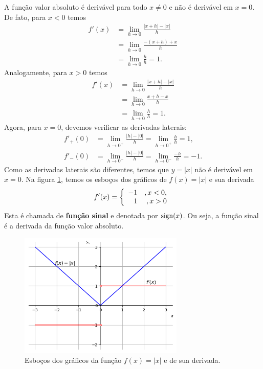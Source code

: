 \begin{ex}\label{ex:deriv_dabs}
  A função valor absoluto é derivável para todo $x\neq 0$ e não é derivável em $x=0$. De fato, para $x<0$ temos
  \begin{align}
    f'(x) &= \lim_{h\to 0} \frac{|x+h|-|x|}{h}\\
          &= \lim_{h\to 0} \frac{-(x+h)+x}{h}\\
          &= \lim_{h\to 0} \frac{h}{h} = 1.
  \end{align}
  Analogamente, para $x>0$ temos
  \begin{align}
    f'(x) &= \lim_{h\to 0} \frac{|x+h|-|x|}{h}\\
          &= \lim_{h\to 0} \frac{x+h-x}{h}\\
          &= \lim_{h\to 0} \frac{h}{h} = 1.
  \end{align}
  Agora, para $x=0$, devemos verificar as derivadas laterais:
  \begin{align}
    f'_+(0) &= \lim_{h\to 0^+} \frac{|h|-|0|}{h} = \lim_{h\to 0^+} \frac{h}{h} = 1,\\
    f'_-(0) &= \lim_{h\to 0^-} \frac{|h|-|0|}{h} = \lim_{h\to 0^-} \frac{-h}{h} = -1.
  \end{align}
  Como as derivadas laterais são diferentes, temos que $y = |x|$ não é derivável em $x=0$. Na figura \ref{fig:deriv_ex_ffl_absx}, temos os esboços dos gráficos de $f(x) = |x|$ e sua derivada
  \begin{equation}\label{eq:deriv_signx}
    f'(x) = \left\{
      \begin{array}[H]{rr}
        -1 &, x<0,\\
        1 &, x> 0
      \end{array}
    \right.
  \end{equation}
  Esta é chamada de {\bf função sinal} e denotada por $\operatorname{sign}(x)$. Ou seja, a função sinal é a derivada da função valor absoluto.

  \begin{figure}[H]
    \centering
    \includegraphics[width=0.7\textwidth]{./cap_deriv/dados/fig_deriv_ex_ffl_absx/fig_deriv_ex_ffl_absx}
    \caption{Esboços dos gráficos da função $f(x)=|x|$ e de sua derivada.}
    \label{fig:deriv_ex_ffl_absx}
  \end{figure}


\end{ex}
